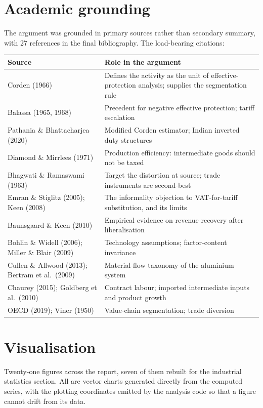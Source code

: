 \documentclass[11pt, a4paper]{article}
\begin{document}
\section{Academic grounding}

The argument was grounded in primary sources rather than secondary summary, with
27 references in the final bibliography. The load-bearing citations:

\begin{table}[H]
\centering\small
\begin{tabular}{p{5.4cm}p{9.6cm}}
\toprule
\textbf{Source} & \textbf{Role in the argument} \\
\midrule
Corden (1966) & Defines the activity as the unit of effective-protection analysis; supplies the segmentation rule \\
Balassa (1965, 1968) & Precedent for negative effective protection; tariff escalation \\
Pathania \& Bhattacharjea (2020) & Modified Corden estimator; Indian inverted duty structures \\
Diamond \& Mirrlees (1971) & Production efficiency: intermediate goods should not be taxed \\
Bhagwati \& Ramaswami (1963) & Target the distortion at source; trade instruments are second-best \\
Emran \& Stiglitz (2005); Keen (2008) & The informality objection to VAT-for-tariff substitution, and its limits \\
Baunsgaard \& Keen (2010) & Empirical evidence on revenue recovery after liberalisation \\
Bohlin \& Widell (2006); Miller \& Blair (2009) & Technology assumptions; factor-content invariance \\
Cullen \& Allwood (2013); Bertram et al.\ (2009) & Material-flow taxonomy of the aluminium system \\
Chaurey (2015); Goldberg et al.\ (2010) & Contract labour; imported intermediate inputs and product growth \\
OECD (2019); Viner (1950) & Value-chain segmentation; trade diversion \\
\bottomrule
\end{tabular}
\end{table}

\section{Visualisation}

Twenty-one figures across the report, seven of them rebuilt for the industrial
statistics section. All are vector charts generated directly from the computed
series, with the plotting coordinates emitted by the analysis code so that a figure
cannot drift from its data.
\end{document}
